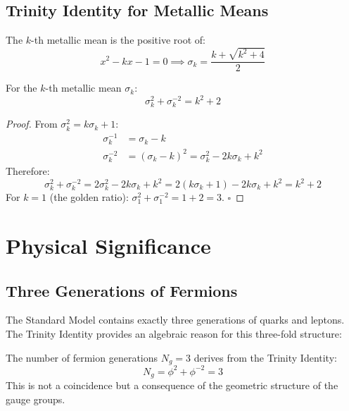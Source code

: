 \subsection{Trinity Identity for Metallic Means}

\begin{definition}
The $k$-th metallic mean is the positive root of:
\begin{equation}
    x^2 - kx - 1 = 0 \implies \sigma_k = \frac{k + \sqrt{k^2 + 4}}{2}
\end{equation}
\end{definition}

\begin{proposition}
\label{prop:generalized-trinity}
For the $k$-th metallic mean $\sigma_k$:
\begin{equation}
    \sigma_k^2 + \sigma_k^{-2} = k^2 + 2
\end{equation}
\end{proposition}

\begin{proof}
From $\sigma_k^2 = k\sigma_k + 1$:
\begin{align}
    \sigma_k^{-1} &= \sigma_k - k \\
    \sigma_k^{-2} &= (\sigma_k - k)^2 = \sigma_k^2 - 2k\sigma_k + k^2
\end{align}
Therefore:
\begin{equation}
    \sigma_k^2 + \sigma_k^{-2} = 2\sigma_k^2 - 2k\sigma_k + k^2 = 2(k\sigma_k + 1) - 2k\sigma_k + k^2 = k^2 + 2
\end{equation}
For $k = 1$ (the golden ratio): $\sigma_1^2 + \sigma_1^{-2} = 1 + 2 = 3$. \quad $\square$
\end{proof}

\section{Physical Significance}

\subsection{Three Generations of Fermions}

The Standard Model contains exactly three generations of quarks and leptons. The Trinity Identity provides an algebraic reason for this three-fold structure:

\begin{conjecture}
The number of fermion generations $N_g = 3$ derives from the Trinity Identity:
\begin{equation}
    N_g = \phi^2 + \phi^{-2} = 3
\end{equation}
This is not a coincidence but a consequence of the geometric structure of the gauge groups.
\end{conjecture}

